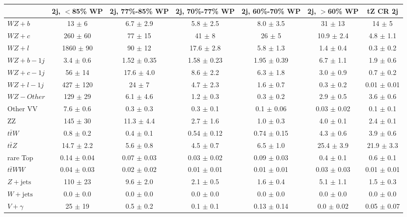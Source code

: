 \begin{tabular}{|l|c|c|c|c|c|c|}
\hline 
 & {2j, $<$85\% WP} & {2j, 77\%-85\% WP} & {2j, 70\%-77\% WP} & {2j, 60\%-70\% WP} & {2j, $>$60\% WP} & {tZ CR 2j}\\
\hline 
  $WZ + b$   & 13 $\pm$ 6 & 6.7 $\pm$ 2.9 & 5.8 $\pm$ 2.5 & 8.0 $\pm$ 3.5 & 31 $\pm$ 13 & 14 $\pm$ 5 \\ 
  $WZ + c$   & 260 $\pm$ 60 & 77 $\pm$ 15 & 41 $\pm$ 8 & 26 $\pm$ 5 & 10.9 $\pm$ 2.4 & 4.8 $\pm$ 1.1 \\ 
  $WZ + l$   & 1860 $\pm$ 90 & 90 $\pm$ 12 & 17.6 $\pm$ 2.8 & 5.8 $\pm$ 1.3 & 1.4 $\pm$ 0.4 & 0.3 $\pm$ 0.2 \\ 
  $WZ + b - 1j$   & 3.4 $\pm$ 0.6 & 1.52 $\pm$ 0.35 & 1.58 $\pm$ 0.23 & 1.95 $\pm$ 0.39 & 6.7 $\pm$ 1.1 & 1.9 $\pm$ 0.6 \\
  $WZ + c - 1j$   & 56 $\pm$ 14 & 17.6 $\pm$ 4.0 & 8.6 $\pm$ 2.2 & 6.3 $\pm$ 1.8 & 3.0 $\pm$ 0.9 & 0.7 $\pm$ 0.2 \\
  $WZ + l - 1j$   & 427 $\pm$ 120 & 24 $\pm$ 7 & 4.7 $\pm$ 2.3 & 1.6 $\pm$ 0.7 & 0.3 $\pm$ 0.2 & 0.01 $\pm$ 0.01 \\
  $WZ - Other$   & 129 $\pm$ 29 & 6.1 $\pm$ 4.6 & 1.2 $\pm$ 0.3 & 0.3 $\pm$ 0.2 & 2.9 $\pm$ 0.5 & 3.6 $\pm$ 0.6 \\
  Other VV   & 7.6 $\pm$ 0.6 & 0.3 $\pm$ 0.3 & 0.3 $\pm$ 0.1 & 0.1 $\pm$ 0.06 & 0.03 $\pm$ 0.02 & 0.1 $\pm$ 0.1 \\ 
  ZZ  & 145 $\pm$ 30 & 11.3 $\pm$ 4.4 & 2.7 $\pm$ 1.6 & 1.0 $\pm$ 0.3 & 4.0 $\pm$ 0.1 & 2.4 $\pm$ 0.1 \\ 
  $t\bar{t}W$   & 0.8 $\pm$ 0.2 & 0.4 $\pm$ 0.1 & 0.54 $\pm$ 0.12 & 0.74 $\pm$ 0.15 & 4.3 $\pm$ 0.6 & 3.9 $\pm$ 0.6 \\ 
  $t\bar{t}Z$   & 14.7 $\pm$ 2.2 & 5.6 $\pm$ 0.8 & 4.5 $\pm$ 0.7 & 6.5 $\pm$ 1.0 & 25.4 $\pm$ 3.9 & 21.9 $\pm$ 3.3 \\ 
  rare Top   & 0.14 $\pm$ 0.04 & 0.07 $\pm$ 0.03 & 0.03 $\pm$ 0.02 & 0.09 $\pm$ 0.03 & 0.4 $\pm$ 0.1 & 0.6 $\pm$ 0.1 \\ 
  $t\bar{t}WW$   & 0.04 $\pm$ 0.03 & 0.02 $\pm$ 0.02 & 0.01 $\pm$ 0.01 & 0.01 $\pm$ 0.01 & 0.03 $\pm$ 0.03 & 0.01 $\pm$ 0.01 \\ 
  $Z+\text{jets}$   & 110 $\pm$ 23 & 9.6 $\pm$ 2.0 & 2.1 $\pm$ 0.5 & 1.6 $\pm$ 0.4 & 5.1 $\pm$ 1.1 & 1.5 $\pm$ 0.3 \\ 
  $W+\text{jets}$   & 0.0 $\pm$ 0.0 & 0.0 $\pm$ 0.0 & 0.0 $\pm$ 0.0 & 0.0 $\pm$ 0.0 & 0.0 $\pm$ 0.0 & 0.0 $\pm$ 0.0 \\ 
  $V+\gamma$   & 25 $\pm$ 19 & 0.5 $\pm$ 0.2 & 0.1 $\pm$ 0.1 & 0.13 $\pm$ 0.14 & 0.0 $\pm$ 0.02 & 0.05 $\pm$ 0.07 \\ 

\end{tabular}
